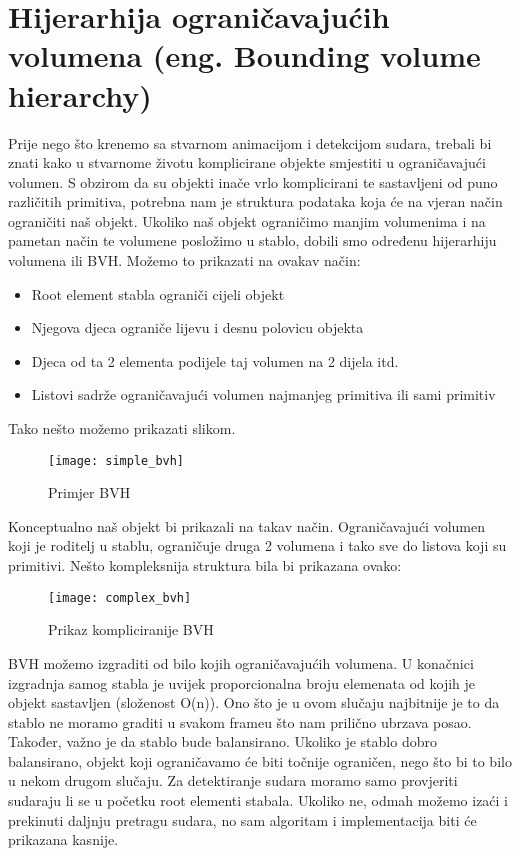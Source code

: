 \chapter{Hijerarhija ograničavajućih volumena (eng. Bounding volume hierarchy)}\label{cha:BVH}
Prije nego što krenemo sa stvarnom animacijom i detekcijom sudara, trebali bi znati kako u stvarnome životu komplicirane objekte smjestiti u ograničavajući volumen. S obzirom da su objekti inače vrlo komplicirani te sastavljeni od puno različitih primitiva, potrebna nam je struktura podataka koja će na vjeran način ograničiti naš objekt. Ukoliko naš objekt ograničimo manjim volumenima i na pametan način te volumene posložimo u stablo, dobili smo određenu hijerarhiju volumena ili BVH. Možemo to prikazati na ovakav način:
\begin{itemize}
	\item Root element stabla ograniči cijeli objekt
	\item Njegova djeca ograniče lijevu i desnu polovicu objekta
	\item Djeca od ta 2 elementa podijele taj volumen na 2 dijela itd.
	\item Listovi sadrže ograničavajući volumen najmanjeg primitiva ili sami primitiv
\end{itemize}
Tako nešto možemo prikazati slikom.
\newpage
\begin{figure}[!http]
		\begin{center}
			\texttt{[image: simple\_bvh]}
			\caption{Primjer BVH\cite{4}}
			\label{fig:6}
		\end{center}
\end{figure}
Konceptualno naš objekt bi prikazali na takav način. Ograničavajući volumen koji je roditelj u stablu, ograničuje druga 2 volumena i tako sve do listova koji su primitivi. Nešto kompleksnija struktura bila bi prikazana ovako:
\begin{figure}[!http]
	\begin{center}
		\texttt{[image: complex\_bvh]}
		\caption{Prikaz kompliciranije BVH \cite{4}}
		\label{fig:7}
	\end{center}
	\end{figure}
BVH možemo izgraditi od bilo kojih ograničavajućih volumena. U konačnici izgradnja samog stabla je uvijek proporcionalna broju elemenata od kojih je objekt sastavljen (složenost O(n))\cite{1}. Ono što je u ovom slučaju najbitnije je to da stablo ne moramo graditi u svakom frameu što nam prilično ubrzava posao. Također, važno je da stablo bude balansirano. Ukoliko je stablo dobro balansirano, objekt koji ograničavamo će biti točnije ograničen, nego što bi to bilo u nekom drugom slučaju. Za detektiranje sudara moramo samo provjeriti sudaraju li se u početku root elementi stabala. Ukoliko ne, odmah možemo izaći i prekinuti daljnju pretragu sudara, no sam algoritam i implementacija biti će prikazana kasnije.
	
